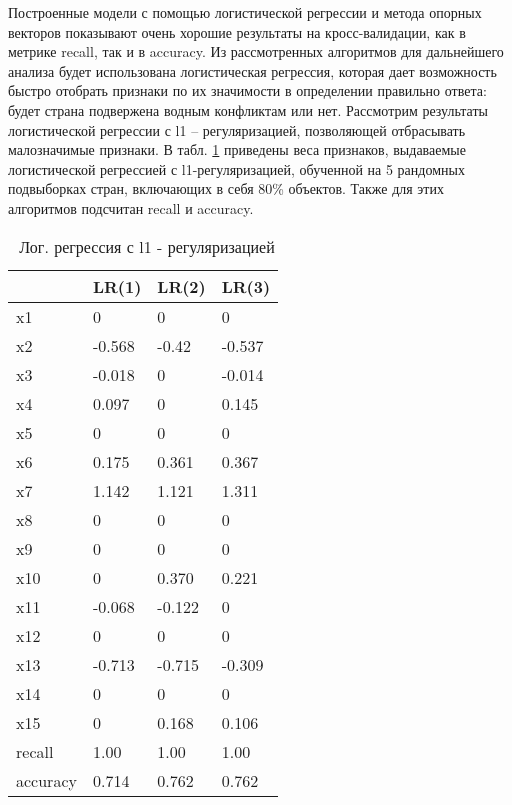 \documentclass[a4paper, 12pt]{article}
\theoremstyle{plain} %
\theoremstyle{definition} %
\theoremstyle{remark} %
\begin{document}
Построенные модели с помощью логистической регрессии и метода опорных векторов показывают очень хорошие результаты на кросс-валидации, как в метрике recall, так и в accuracy. Из рассмотренных алгоритмов для дальнейшего анализа будет использована логистическая регрессия, которая дает возможность быстро отобрать признаки по их значимости в определении правильно ответа: будет страна подвержена водным конфликтам или нет. Рассмотрим результаты логистической регрессии с l1 – регуляризацией, позволяющей отбрасывать малозначимые признаки. В табл. \ref{log} приведены веса признаков, выдаваемые логистической регрессией с l1-регуляризацией, обученной на 5 рандомных подвыборках стран, включающих в себя 80\% объектов. Также для этих алгоритмов подсчитан recall и accuracy.
\begin{table}[]
	\centering
	\caption{\, Лог. регрессия с l1 - регуляризацией}
	\label{log}
	\begin{tabular}{|l|l|l|l|}
		\hline
		& LR(1)  & LR(2)  & LR(3)  \\ \hline
		x1       & 0      & 0      & 0      \\ \hline
		x2       & -0.568 & -0.42  & -0.537 \\ \hline
		x3       & -0.018 & 0      & -0.014 \\ \hline
		x4       & 0.097  & 0      & 0.145  \\ \hline
		x5       & 0      & 0      & 0      \\ \hline
		x6       & 0.175  & 0.361  & 0.367  \\ \hline
		x7       & 1.142  & 1.121  & 1.311  \\ \hline
		x8       & 0      & 0      & 0      \\ \hline
		x9       & 0      & 0      & 0      \\ \hline
		x10      & 0      & 0.370  & 0.221  \\ \hline
		x11      & -0.068 & -0.122 & 0      \\ \hline
		x12      & 0      & 0      & 0      \\ \hline
		x13      & -0.713 & -0.715 & -0.309 \\ \hline
		x14      & 0      & 0      & 0      \\ \hline
		x15      & 0      & 0.168  & 0.106  \\ \hline
		recall   & 1.00   & 1.00   & 1.00   \\ \hline
		accuracy & 0.714  & 0.762  & 0.762  \\ \hline
	\end{tabular}
\end{table}
\end{document}
